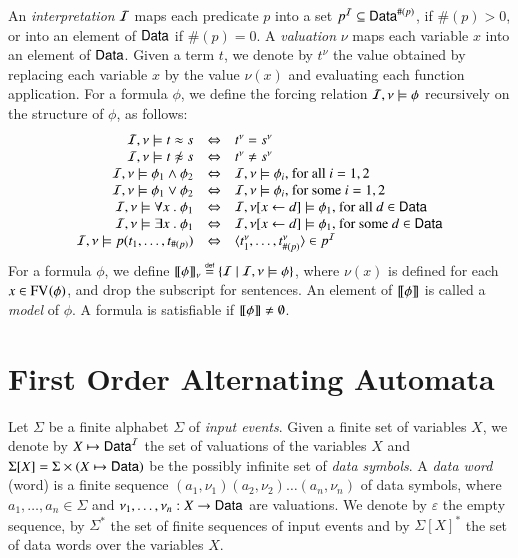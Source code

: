 \documentclass{llncs}
\begin{document}

An \emph{interpretation} $\mathcal{I}$ maps each predicate $p$ into a set $p^{\mathcal{I}}
\subseteq \mathsf{Data}^{\#(p)}$, if $\#(p)>0$, or into an element of $\mathsf{Data}$
if $\#(p)=0$. A \emph{valuation} $\nu$ maps each variable $x$ into an
element of $\mathsf{Data}$. Given a term $t$, we denote by $t^\nu$ the value
obtained by replacing each variable $x$ by the value $\nu(x)$ and
evaluating each function application. For a formula $\phi$, we define
the forcing relation $\mathcal{I},\nu \models \phi$ recursively on the
structure of $\phi$, as follows:
\[
\begin{array}{rcl}
\I,\nu \models t \teq s & \iff & t^\nu=s^\nu \\
\I,\nu \models t \not\teq s & \iff & t^\nu \neq s^\nu \\
\I,\nu \models \phi_1 \wedge \phi_2 & \iff & \I,\nu \models \phi_i \text{, for all } i=1,2 \\ 
\I,\nu \models \phi_1 \vee \phi_2 & \iff & \I,\nu \models \phi_i \text{, for some } i=1,2 \\
\I,\nu \models \forall x ~.~ \phi_1 & \iff & \I,\nu[x\leftarrow d] \models \phi_1 \text{, for all } d \in \Data \\
\I,\nu \models \exists x ~.~ \phi_1 & \iff & \I,\nu[x\leftarrow d] \models \phi_1 \text{, for some } d \in \Data \\
\I,\nu \models p(t_1,\ldots,t_{\#(p)}) & \iff & \tuple{t_1^\nu,\ldots,t_{\#(p)}^\nu} \in p^\I 
\end{array}
\]
For a formula $\phi$, we define ${\bf [\![} \phi {\bf ]\!]}_\nu \stackrel{\scriptscriptstyle{\mathsf{def}}}{=} \{ \mathcal{I} \mid
  \mathcal{I},\nu \models \phi \}$, where $\nu(x)$ is defined for each $x \in
\mathrm{FV}_{}(\phi)$, and drop the subscript for sentences. An element of
${\bf [\![} \phi {\bf ]\!]}$ is called a \emph{model} of $\phi$. A formula is
satisfiable if ${\bf [\![} \phi {\bf ]\!]}\neq\emptyset$. 

\section{First Order Alternating Automata}

Let $\Sigma$ be a finite alphabet $\Sigma$ of \emph{input
  events}. Given a finite set of variables $X$, we denote by $X
\mapsto \mathsf{Data}^{\mathcal{I}}$ the set of valuations of the variables $X$ and
$\Sigma[X] = \Sigma \times (X \mapsto \mathsf{Data})$ be the possibly infinite
set of \emph{data symbols}. A \emph{data word} (word) is a finite
sequence $(a_1,\nu_1)(a_2,\nu_2) \ldots (a_n,\nu_n)$ of data symbols,
where $a_1,\ldots,a_n \in \Sigma$ and $\nu_1,\ldots,\nu_n : X
\rightarrow \mathsf{Data}$ are valuations. We denote by $\varepsilon$ the
empty sequence, by $\Sigma^*$ the set of finite sequences of input
events and by $\Sigma[X]^*$ the set of data words over the variables
$X$.
\end{document}
